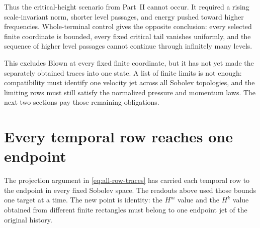 Thus the critical-height scenario from Part~II cannot occur.  It required a
rising scale-invariant norm, shorter level passages, and energy pushed toward
higher frequencies.  Whole-terminal control gives the opposite conclusion:
every selected finite coordinate is bounded, every fixed critical tail
vanishes uniformly, and the sequence of higher level passages cannot continue
through infinitely many levels.

This excludes Blown at every fixed finite coordinate, but it has not yet made
the separately obtained traces into one state.  A list of finite limits is not
enough: compatibility must identify one velocity jet across all Sobolev
topologies, and the limiting rows must still satisfy the normalized pressure
and momentum laws.  The next two sections pay those remaining obligations.

\section{Every temporal row reaches one endpoint}
\label{sec:terminal-row-traces}

The projection argument in \eqref{eq:all-row-traces} has carried each
temporal row to the endpoint in every fixed Sobolev space.  The readouts above
used those bounds one target at a time.  The new point is identity: the
\(H^m\) value and the \(H^k\) value obtained from different finite rectangles
must belong to one endpoint jet of the original history.


